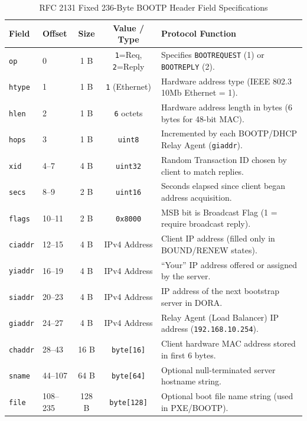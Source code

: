 \documentclass[11pt,a4paper]{article}
\begin{document}
\begin{table}[H]
\centering
\caption{RFC 2131 Fixed 236-Byte BOOTP Header Field Specifications}
\label{tab:bootp_fields}
\small
\begin{tabularx}{\textwidth}{@{}llccY@{}}
\toprule
\textbf{Field} & \textbf{Offset} & \textbf{Size} & \textbf{Value / Type} & \textbf{Protocol Function} \\ \midrule
\texttt{op} & 0 & 1 B & \texttt{1}=Req, \texttt{2}=Reply & Specifies \texttt{BOOTREQUEST} (1) or \texttt{BOOTREPLY} (2). \\
\texttt{htype} & 1 & 1 B & \texttt{1} (Ethernet) & Hardware address type (IEEE 802.3 10Mb Ethernet = 1). \\
\texttt{hlen} & 2 & 1 B & \texttt{6} octets & Hardware address length in bytes (6 bytes for 48-bit MAC). \\
\texttt{hops} & 3 & 1 B & \texttt{uint8} & Incremented by each BOOTP/DHCP Relay Agent (\texttt{giaddr}). \\
\texttt{xid} & 4--7 & 4 B & \texttt{uint32} & Random Transaction ID chosen by client to match replies. \\
\texttt{secs} & 8--9 & 2 B & \texttt{uint16} & Seconds elapsed since client began address acquisition. \\
\texttt{flags} & 10--11 & 2 B & \texttt{0x8000} & MSB bit is Broadcast Flag (1 = require broadcast reply). \\
\texttt{ciaddr} & 12--15 & 4 B & IPv4 Address & Client IP address (filled only in BOUND/RENEW states). \\
\texttt{yiaddr} & 16--19 & 4 B & IPv4 Address & ``Your'' IP address offered or assigned by the server. \\
\texttt{siaddr} & 20--23 & 4 B & IPv4 Address & IP address of the next bootstrap server in DORA. \\
\texttt{giaddr} & 24--27 & 4 B & IPv4 Address & Relay Agent (Load Balancer) IP address (\texttt{192.168.10.254}). \\
\texttt{chaddr} & 28--43 & 16 B & \texttt{byte[16]} & Client hardware MAC address stored in first 6 bytes. \\
\texttt{sname} & 44--107 & 64 B & \texttt{byte[64]} & Optional null-terminated server hostname string. \\
\texttt{file} & 108--235 & 128 B & \texttt{byte[128]} & Optional boot file name string (used in PXE/BOOTP). \\ \bottomrule
\end{tabularx}
\end{table}
\end{document}
